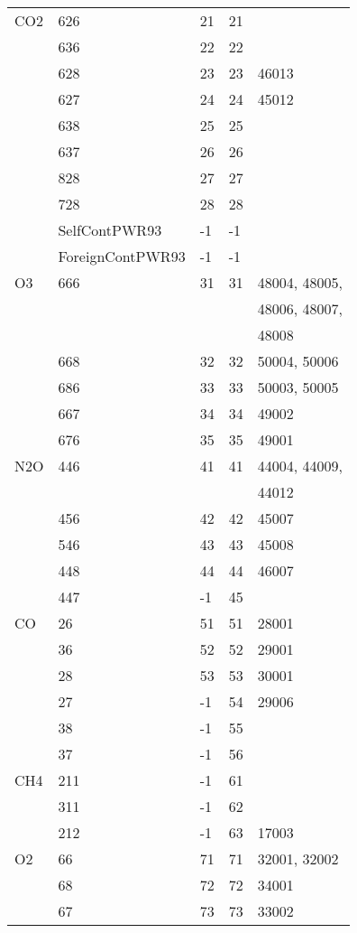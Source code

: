 \begin{longtable}{lllll}
\hline                  
  CO2& 626&  21&    21&\\
     & 636&  22&    22&\\
     & 628&  23&    23&  46013\\
     & 627&  24&    24&  45012\\
     & 638&  25&    25&\\
     & 637&  26&    26&\\
     & 828&  27&    27&\\
     & 728&  28&    28&\\
     &SelfContPWR93&    -1&-1&\\
     &ForeignContPWR93& -1&-1&\\
\hline                  
  O3& 666&  31&    31&  48004, 48005,\\
    &    &    &      &  48006, 48007,\\
    &    &    &      &  48008\\
    & 668&  32&    32&  50004, 50006\\
    & 686&  33&    33&  50003, 50005\\
    & 667&  34&    34&  49002\\
    & 676&  35&    35&  49001\\
\hline                  
  N2O& 446&  41&    41&  44004, 44009,\\
     &    &    &      &  44012\\
     & 456&  42&    42&  45007\\
     & 546&  43&    43&  45008\\
     & 448&  44&    44&  46007\\
     & 447&  -1&    45&\\
\hline                   
  CO&   26&  51&    51&  28001\\
    & 36&  52&    52&  29001\\
    & 28&  53&    53&  30001\\
    & 27&  -1&    54&  29006\\
    & 38&  -1&    55&\\
    & 37&  -1&    56&\\
\hline                  
  CH4& 211&  -1&    61&\\
     & 311&  -1&    62&\\
     & 212&  -1&    63&  17003\\
\hline                  
  O2& 66&  71&    71&  32001, 32002\\
    & 68&  72&    72&  34001\\
    & 67&  73&    73&  33002\\

\end{longtable}
